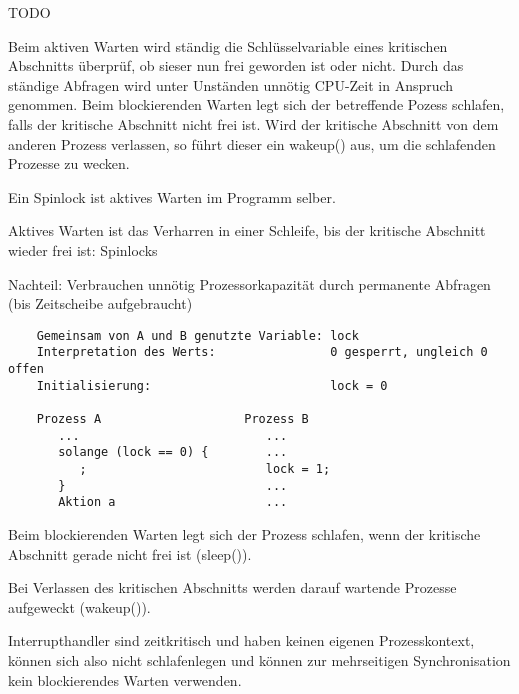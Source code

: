 \begin{answer}
TODO
\end{answer}

\begin{answer}
Beim aktiven Warten wird ständig die Schlüsselvariable eines kritischen Abschnitts überprüf, ob sieser nun frei geworden ist oder nicht. Durch das ständige Abfragen wird unter Unständen unnötig CPU-Zeit in Anspruch genommen.
Beim blockierenden Warten legt sich der betreffende Pozess schlafen, falls der kritische Abschnitt nicht frei ist. Wird der kritische Abschnitt von dem anderen Prozess verlassen, so führt dieser ein wakeup() aus, um die schlafenden Prozesse zu wecken.
\end{answer}

\begin{answer}
Ein Spinlock ist aktives Warten im Programm selber.
\end{answer}

\begin{answer}
Aktives Warten ist das Verharren in einer Schleife, bis der kritische Abschnitt wieder frei ist: Spinlocks

Nachteil: Verbrauchen unnötig Prozessorkapazität durch permanente Abfragen (bis Zeitscheibe aufgebraucht)

\begin{verbatim}
    Gemeinsam von A und B genutzte Variable: lock
    Interpretation des Werts:                0 gesperrt, ungleich 0 offen 
    Initialisierung:                         lock = 0
           
    Prozess A                    Prozess B
       ...                          ...
       solange (lock == 0) {        ...
          ;                         lock = 1;
       }                            ...
       Aktion a                     ...
\end{verbatim}
\end{answer}

\begin{answer}
Beim blockierenden Warten legt sich der Prozess schlafen, wenn der kritische Abschnitt gerade nicht frei ist (sleep()).

Bei Verlassen des kritischen Abschnitts werden darauf wartende Prozesse aufgeweckt (wakeup()).

Interrupthandler sind zeitkritisch und haben keinen eigenen Prozesskontext, können sich also nicht schlafenlegen und können zur mehrseitigen Synchronisation kein blockierendes Warten verwenden.
\end{answer}

